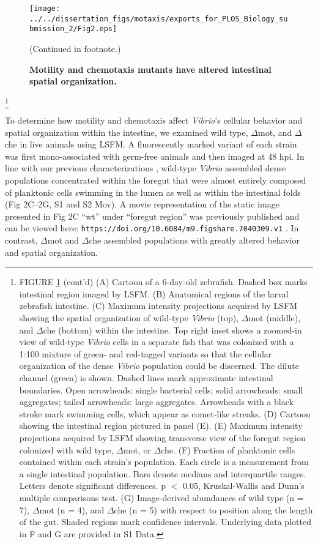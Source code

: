 {\begin{figure}%
	\centerline{
		\texttt{[image: ../../dissertation\_figs/motaxis/exports\_for\_PLOS\_Biology\_submission\_2/Fig2.eps]}}
	\caption{\textbf{Motility and chemotaxis mutants have altered intestinal spatial organization.}}{(Continued in footnote.)}
	\label{fig:motaxis_fig2}
\end{figure}

{\let\thefootnote\relax\footnote{FIGURE \ref{fig:motaxis_fig2} (cont'd) (A) Cartoon of a 6-day-old zebrafish. Dashed box marks intestinal region imaged by LSFM. (B) Anatomical regions of the larval zebrafish intestine. (C) Maximum intensity projections acquired by LSFM showing the spatial organization of wild-type \textit{Vibrio} (top), $\Delta$mot (middle), and $\Delta$che (bottom) within the intestine. Top right inset shows a zoomed-in view of wild-type \textit{Vibrio} cells in a separate fish that was colonized with a 1:100 mixture of green- and red-tagged variants so that the cellular organization of the dense \textit{Vibrio} population could be discerned. The dilute channel (green) is shown. Dashed lines mark approximate intestinal boundaries. Open arrowheads: single bacterial cells; solid arrowheads: small aggregates; tailed arrowheads: large aggregates. Arrowheads with a black stroke mark swimming cells, which appear as comet-like streaks. (D) Cartoon showing the intestinal region pictured in panel (E). (E) Maximum intensity projections acquired by LSFM showing transverse view of the foregut region colonized with wild type, $\Delta$mot, or $\Delta$che. (F) Fraction of planktonic cells contained within each strain's population. Each circle is a measurement from a single intestinal population. Bars denote medians and interquartile ranges. Letters denote significant differences. p $ < $ 0.05, Kruskal-Wallis and Dunn's multiple comparisons test. (G) Image-derived abundances of wild type (n = 7), $\Delta$mot (n = 4), and $\Delta$che (n = 5) with respect to position along the length of the gut. Shaded regions mark confidence intervals. Underlying data plotted in F and G are provided in S1 Data.}


To determine how motility and chemotaxis affect \textit{Vibrio}'s cellular behavior and spatial organization within the intestine, we examined wild type, $\Delta$mot, and $\Delta$che in live animals using LSFM. A fluorescently marked variant of each strain was first mono-associated with germ-free animals and then imaged at 48 hpi. In line with our previous characterizations \cite{wiles_modernized_2018,schlomann_bacterial_2018}, wild-type \textit{Vibrio} assembled dense populations concentrated within the foregut that were almost entirely composed of planktonic cells swimming in the lumen as well as within the intestinal folds (Fig 2C–2G, S1 and S2 Mov). A movie representation of the static image presented in Fig 2C ``wt'' under ``foregut region'' was previously published and can be viewed here: \texttt{https://doi.org/10.6084/m9.figshare.7040309.v1} \cite{wiles_modernized_2018}. In contrast, $\Delta$mot and $\Delta$che assembled populations with greatly altered behavior and spatial organization. 

}}
